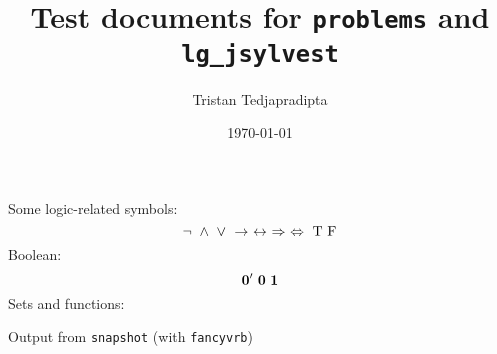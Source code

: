 \documentclass[a4paper]{article}
\title{Test documents for \texttt{problems} and \texttt{lg\_jsylvest}}
\author{Tristan Tedjapradipta}
\date{\today}
\begin{document}
    Some logic-related symbols:
    \begin{equation}
        \lgcnot \ \lgcand \ \lgcor \ \lgccond \ \lgcbicond \ \lgcimplies \ \lgcequiv \ \lgctrue \ \lgcfalse
    \end{equation}
    Boolean:
    \begin{equation}
        \boolnot{\boolzero} \ \boolzero \ \boolone
    \end{equation}
    Sets and functions:

    \pagebreak
    Output from \texttt{snapshot} (with \texttt{fancyvrb})
\end{document}
